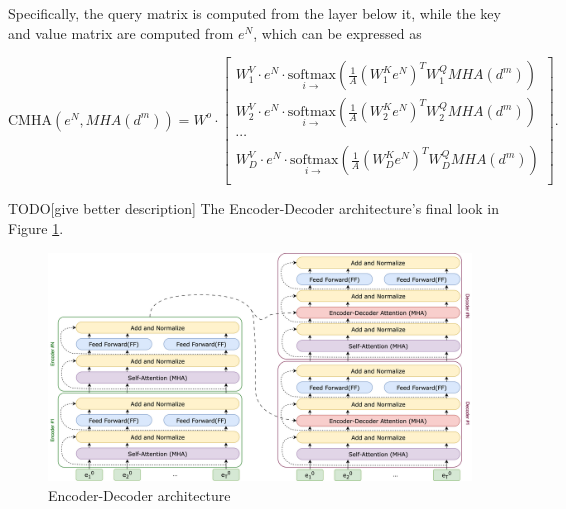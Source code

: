 Specifically, the query matrix is computed from the layer below it, while the key and value matrix are computed from $e^N$, which can be expressed as

\begin{equation}
    \mathrm{CMHA}(e^N, MHA(d^m)) = W^o \cdot
\begin{bmatrix}
    W^V_1 \cdot e^N \cdot \underset{i \rightarrow}{\mathrm{softmax}}\left( \frac{1}{A} \left(W^K_1 e^N\right)^T W^Q_1 MHA(d^m) \right)\\
    W^V_2 \cdot e^N \cdot \underset{i \rightarrow}{\mathrm{softmax}}\left( \frac{1}{A} \left(W^K_2 e^N\right)^T W^Q_2 MHA(d^m) \right)\\
    \cdots\\
    W^V_D \cdot e^N \cdot \underset{i \rightarrow}{\mathrm{softmax}}\left( \frac{1}{A} \left(W^K_D e^N\right)^T W^Q_D MHA(d^m) \right)\\
\end{bmatrix}\nonumber.
\end{equation}


TODO[give better description] The Encoder-Decoder architecture's final look in Figure \ref{fig:encoder_decoder}.

\begin{figure}[h]
    \centering
    \includegraphics[width=16cm]{pages/imgs/encoder_decoder.png}
    \caption{Encoder-Decoder architecture}
    \label{fig:encoder_decoder}
\end{figure}



